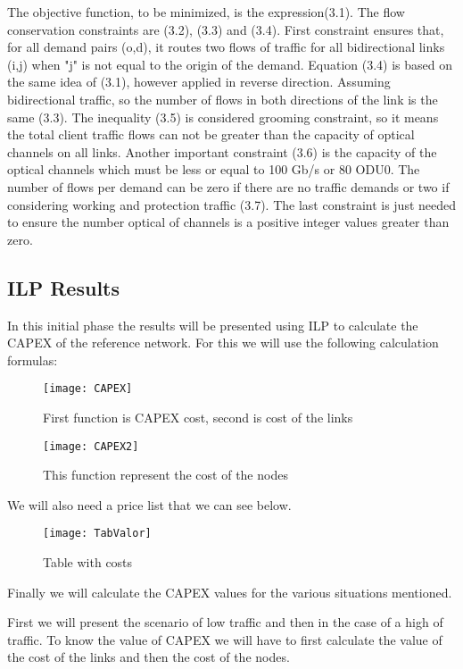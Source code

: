 The objective function, to be minimized, is the expression(3.1). The flow conservation constraints are (3.2), (3.3) and (3.4). First constraint ensures that, for all demand pairs (o,d), it routes two flows of traffic for all bidirectional links (i,j) when "j" is not equal to the origin of the demand. Equation (3.4) is based on the same idea of (3.1), however applied in reverse direction. Assuming bidirectional traffic, so the number of flows in both directions of the link is the same (3.3). The inequality (3.5) is considered grooming constraint, so it means the total client traffic flows can not be greater than the capacity of optical channels on all links. Another important constraint (3.6) is the capacity of the optical channels which must be less or equal to 100 Gb/s or 80 ODU0. The number of flows per demand can be zero if there are no traffic demands or two if considering working and protection traffic (3.7). The last constraint is just needed to ensure the number optical of channels is a positive integer values greater than zero.


\subsection{ILP Results}
In this initial phase the results will be presented using ILP to calculate the CAPEX of the reference network.
For this we will use the following calculation formulas:

\begin{figure}[h!]
  \centering
  \texttt{[image: CAPEX]}
  \caption{First function is CAPEX cost, second is cost of the links}
\end{figure}

\begin{figure}[h!]
  \centering
  \texttt{[image: CAPEX2]}
  \caption{This function represent the cost of the nodes}
\end{figure}

We will also need a price list that we can see below.

\begin{figure}[h!]
  \centering
  \texttt{[image: TabValor]}
  \caption{Table with costs}
\end{figure}

Finally we will calculate the CAPEX values for the various situations mentioned.

First we will present the scenario of low traffic and then in the case of a high of traffic.
To know the value of CAPEX we will have to first calculate the value of the cost of the links and then the cost of the nodes.

